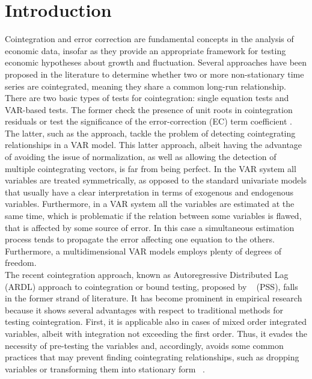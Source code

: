 \section{Introduction}\label{sec:intro}
 Cointegration and error correction are fundamental concepts in the analysis of economic data, insofar as they provide an appropriate framework for testing economic hypotheses about growth and fluctuation. 
 Several approaches have been proposed in the literature to determine whether two or more non-stationary time series are cointegrated, meaning they share a common long-run relationship.\\ 
There are two basic types of tests for cointegration: single equation tests and VAR-based tests. The former check the presence of unit roots in cointegration residuals \citep[see, e.g.,][]{engle1987co,engleyoo87,Mackinnon91,gabriel2002,cook2006power} or test the significance of the error-correction (EC) term coefficient \citep{kremers1992power,maddala1998,arranz2000,ericsson2002}. The latter, such as the \citet{johansen1991} approach, tackle the problem of detecting cointegrating relationships in a VAR model.
This latter approach, albeit having the advantage of avoiding the issue of normalization, as well as allowing the detection of multiple cointegrating vectors, is far from being perfect. In the VAR system all variables are treated symmetrically, as opposed to the standard univariate models that usually have a clear interpretation in terms of exogenous and endogenous variables. Furthermore, in a VAR system all the variables are estimated at the same time, which is problematic if the relation between some variables is flawed, that is affected by some source of error. In this case a simultaneous estimation process tends to propagate the error affecting one equation to the others.   
Furthermore, a multidimensional VAR models employs plenty of degrees of freedom.\\
The recent cointegration approach, known as Autoregressive Distributed Lag (ARDL) approach to cointegration or bound testing, proposed by ~\citet{pesaran2001} (PSS), falls in the former strand of literature. It has become prominent in empirical research because it shows several advantages with respect to traditional methods for testing cointegration. First, it is applicable also in cases of mixed order integrated variables, albeit with integration not exceeding the first order.   
Thus, it evades the necessity of pre-testing the variables and, accordingly, avoids some common practices that may prevent finding cointegrating relationships, such as dropping variables or transforming them into stationary form ~\citep[see][]{mcnown2018bootstrapping}.
